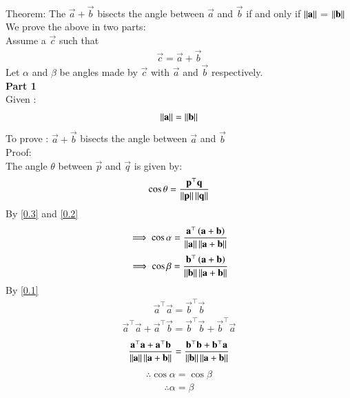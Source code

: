 \documentclass[journal]{IEEEtran}
\begin{document}
	\solution \\
	Theorem: The $\vec{a} + \vec{b}$ bisects the angle between $\vec{a}$ and $\vec{b}$ if and only if $\left\lVert\mathbf{a}\right\rVert$ = $\left\lVert\mathbf{b}\right\rVert$ \\
	We prove the above in two parts:\\
	Assume a $\vec{c}$ such that
	\begin{align}
		\vec{c} = \vec{a} + \vec{b} \label{0.2}
	\end{align}
	Let $\alpha$ and $\beta$ be angles made by $\vec{c}$ with $\vec{a}$ and $\vec{b}$ respectively.\\
	\textbf{Part 1}\\
	Given : 
	\begin{align}
		\left\lVert\mathbf{a}\right\rVert = \left\lVert\mathbf{b}\right\rVert \label{0.1}
	\end{align}
	To prove : $\vec{a} + \vec{b}$ bisects the angle between $\vec{a}$ and $\vec{b}$\\
	Proof: \\	
	The angle $\theta$ between $\vec{p}$ and $\vec{q}$ is given by: 
	\begin{align}
		\cos\theta = \frac{\mathbf{p}^\top\mathbf{q}}{\left\lVert\mathbf{p}\right\rVert\left\lVert\mathbf{q}\right\rVert} \label{0.3}
	\end{align}
	By \eqref{0.3} and \eqref{0.2}
	\begin{align}
		\implies \cos\alpha = \frac{\mathbf{a}^\top\left(\mathbf{a}+\mathbf{b}\right)}{\left\lVert\mathbf{a}\right\rVert\left\lVert\mathbf{a}+\mathbf{b}\right\rVert} 
	\end{align}
	\begin{align}
		\implies \cos\beta = \frac{\mathbf{b}^\top\left(\mathbf{a}+\mathbf{b}\right)}{\left\lVert\mathbf{b}\right\rVert\left\lVert\mathbf{a}+\mathbf{b}\right\rVert} 
	\end{align}
	By \eqref{0.1}
	\begin{align}
		\vec{a}^\top\vec{a} = \vec{b}^\top\vec{b}
	\end{align}
	\begin{align}
		\vec{a}^\top\vec{a} + \vec{a}^\top\vec{b} = \vec{b}^\top\vec{b} + \vec{b}^\top\vec{a}
	\end{align}
	\begin{align}
\frac{\mathbf{a}^\top\mathbf{a} + \mathbf{a}^\top\mathbf{b}}{\left\lVert\mathbf{a}\right\rVert\left\lVert\mathbf{a}+\mathbf{b}\right\rVert} = \frac{\mathbf{b}^\top\mathbf{b} + \mathbf{b}^\top\mathbf{a}}{\left\lVert\mathbf{b}\right\rVert\left\lVert\mathbf{a}+\mathbf{b}\right\rVert}
	\end{align}
	\begin{align}
	\therefore \cos\alpha=	\cos\beta   \label{angle}
	\end{align}	
	\begin{align}
	\therefore	\alpha=\beta
	\end{align}	
\end{document}
